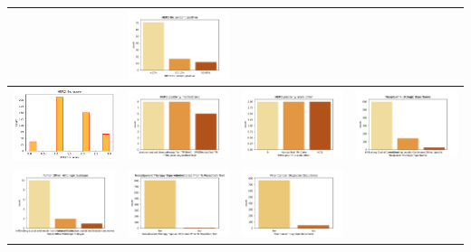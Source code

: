 \begin{center}
\begin{tabular}{ |c|c|c|c| }
		& \includegraphics[width=.25\textwidth]{NOTEBOOK/IMAGENES_CRUDAS/36} 
		\\  \hline 
		\includegraphics[width=.25\textwidth]{NOTEBOOK/IMAGENES_CRUDAS/37} 
		& \includegraphics[width=.25\textwidth]{NOTEBOOK/IMAGENES_CRUDAS/38} 
		& \includegraphics[width=.25\textwidth]{NOTEBOOK/IMAGENES_CRUDAS/39} 
		& \includegraphics[width=.25\textwidth]{NOTEBOOK/IMAGENES_CRUDAS/40} 
		\\  \hline 
		\includegraphics[width=.25\textwidth]{NOTEBOOK/IMAGENES_CRUDAS/41} 
		& \includegraphics[width=.25\textwidth]{NOTEBOOK/IMAGENES_CRUDAS/42} 
		& \includegraphics[width=.25\textwidth]{NOTEBOOK/IMAGENES_CRUDAS/43} 

\end{tabular}
\end{center}
